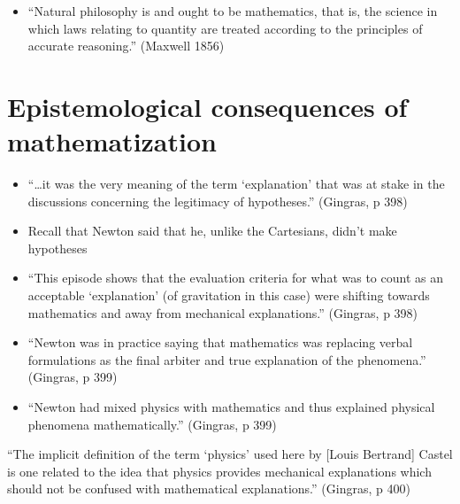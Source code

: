 \documentclass[fleqn]{beamer}
\begin{document}
\begin{frame}

  \begin{itemize}
  \item ``Natural philosophy is and ought to be mathematics, that is,
    the science in which laws relating to quantity are treated
    according to the principles of accurate reasoning.'' (Maxwell 1856)
  \end{itemize}

\end{frame}

\section{Epistemological consequences of mathematization}

\begin{frame}

  \begin{itemize}
  \item ``\dots it was the very meaning of the term `explanation' that
    was at stake in the discussions concerning the legitimacy of
    hypotheses.'' (Gingras, p 398)
  \item Recall that Newton said that he, unlike the Cartesians, didn't
    make hypotheses
  \item ``This episode shows that the evaluation criteria for what was
    to count as an acceptable `explanation' (of gravitation in this
    case) were shifting towards mathematics and away from mechanical
    explanations.'' (Gingras, p 398)
  \end{itemize}

\end{frame}

\begin{frame}

  \begin{itemize}
  \item ``Newton was in practice saying that mathematics was replacing
    verbal formulations as the final arbiter and true explanation of
    the phenomena.'' (Gingras, p 399)
  \item ``Newton had mixed physics with mathematics and thus explained
    physical phenomena mathematically.'' (Gingras, p 399)
  \end{itemize}

\end{frame}

\begin{frame}

  ``The implicit definition of the term `physics' used here by [Louis
  Bertrand] Castel is one related to the idea that physics provides
  mechanical explanations which should not be confused with
  mathematical explanations.'' (Gingras, p 400)

\end{frame}
\end{document}
